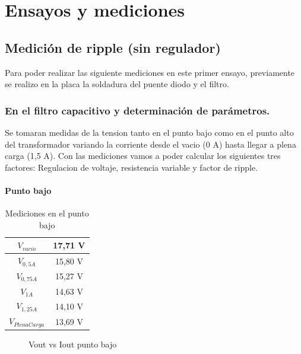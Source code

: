 \chapter{Ensayos y mediciones}

\section{Medición de ripple (sin regulador)}

Para poder realizar las siguiente mediciones en este primer ensayo, previamente se realizo en la placa la soldadura del puente diodo y el filtro.

\subsection{En el filtro capacitivo y determinación de parámetros.}

Se tomaran medidas de la tension tanto en el punto bajo como en el punto alto del transformador variando la
corriente desde el vacio (0 A) hasta llegar a plena carga (1,5 A). Con las mediciones vamos a poder calcular los siguientes tres factores:
Regulacion de voltaje, resistencia variable y factor de ripple.\\

\subsubsection{Punto bajo}

\begin{table}[H]
  \centering
  \begin{tabular}{|c|c|}
    \hline
    $V_{vacio}$ & 17,71 V \\ \hline
    $V_{0,5 A}$ & 15,80 V \\ \hline
    $V_{0,75 A}$ & 15,27 V \\ \hline    
    $V_{1 A}$ & 14,63 V \\ \hline
    $V_{1,25 A}$ & 14,10 V \\ \hline
    $V_{PlenaCarga}$ & 13,69 V \\ \hline
  \end{tabular}
  \caption{Mediciones en el punto bajo}
\end{table}


\begin{figure}[H]
  \centering
  \caption{Vout vs Iout punto bajo}
\end{figure}

